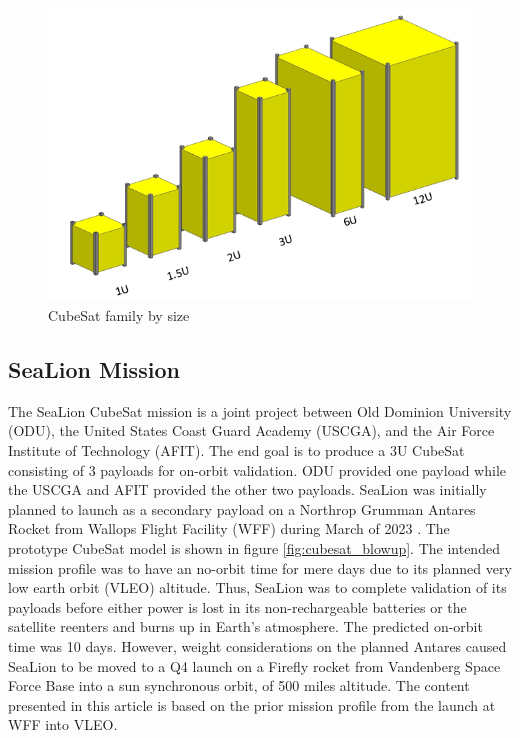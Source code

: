 \documentclass[journal,article,submit,pdftex,moreauthors]{Definitions/mdpi}
\begin{document}
\begin{figure}[H]
    \includegraphics[width=10.5 cm]{assets/cubesat_family.png}
    \caption{CubeSat family by size \cite{cds_rev14}}
	\label{fig:cubesat_family}
    \end{figure}   
\unskip

\subsection{SeaLion Mission}
The SeaLion CubeSat mission is a joint project between Old Dominion University (ODU), the United States Coast Guard Academy (USCGA), and the Air Force Institute of Technology (AFIT).  The end goal is to produce a 3U CubeSat consisting of 3 payloads for on-orbit validation.  ODU provided one payload while the USCGA and AFIT provided the other two payloads.  SeaLion was initially planned to launch as a secondary payload on a Northrop Grumman Antares Rocket from Wallops Flight Facility (WFF) during March of 2023 \cite{sealion_cdr}.  The prototype CubeSat model is shown in figure \ref{fig:cubesat_blowup}.  The intended mission profile was to have an no-orbit time for mere days due to its planned very low earth orbit (VLEO) altitude.  Thus, SeaLion was to complete validation of its payloads before either power is lost in its non-rechargeable batteries or the satellite reenters and burns up in Earth's atmosphere.  The predicted on-orbit time was 10 days.  However, weight considerations on the planned Antares caused SeaLion to be moved to a Q4 launch on a Firefly rocket from Vandenberg Space Force Base into a sun synchronous orbit, of 500 miles altitude.  The content presented in this article is based on the prior mission profile from the launch at WFF into VLEO.
\end{document}
